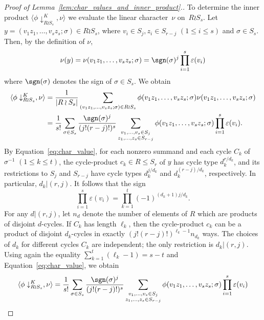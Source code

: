 \begin{proof}[Proof of  Lemma~\ref{lem:char_values_and_inner_product}.]
    To determine the inner product $\langle \phi\downarrow_{R\wr S_{s}}^K,\nu\rangle$ we evaluate the linear character~$\nu$ on~$R\wr S_{s}$.
    Let $y = (v_1z_1,\ldots, v_sz_s; \sigma)\in R\wr S_s$, 
    where $v_i\in S_j, z_i\in S_{r-j}$ $(1 \le i \le s)$ and $\sigma\in S_s$. Then, by the definition of $\nu$,
    \[
        \nu(y)
        = \nu(v_1z_1,\ldots, v_sz_s; \sigma)
        = \sgn(\sigma)^j 
        \prod_{i=1}^s \varepsilon(v_i)
    \]
    where $\sgn(\sigma)$ denotes the sign of $\sigma \in S_s$.
    We obtain
    \begin{align*}
        \langle \phi\downarrow_{R\wr S_{s}}^K,\nu\rangle
        &= \frac{1}{|R\wr S_{s}|}
        \sum_{(v_1 z_1,\ldots,v_s z_s;\sigma) \in R\wr S_{s}} 
        \phi(v_1 z_1,\ldots,v_s z_s;\sigma)
        \nu(v_1 z_1,\ldots,v_s z_s;\sigma) \\
        &= \frac{1}{s!} \sum_{\sigma\in S_s} 
        \frac{\sgn(\sigma)^j}{(j!(r-j)!)^s} 
        \sum_{\substack{v_1,\ldots ,v_s \in S_j \\ z_1,\ldots, z_s \in S_{r-j}}}
        \phi(v_1z_1,\ldots,v_sz_s;\sigma)
        \prod_{i=1}^s \varepsilon(v_i).
    \end{align*}
    By Equation~\eqref{eq:char_value},
    for each nonzero summand and each cycle $C_k$ of $\sigma^{-1}$ $(1 \le k \le t)$,
    the cycle-product $c_k \in R \le S_r$ of $y$ has cycle type $d_k^{r/d_k}$, and its restrictions to $S_j$ and $S_{r-j}$ have cycle types $d_k^{j/{d_k}}$ and $d_k^{(r-j)/{d_k}}$, respectively. 
    In particular, $d_k | (r,j)$.
    It follows that the sign
    \[
        \prod_{i=1}^s \varepsilon(v_i)
        = \prod_{k=1}^{t} (-1)^{(d_k+1)j/d_k}. 
    \]
    For any $d | (r,j)$, 
    let $n_d$ denote the number of elements of $R$ which are products of disjoint $d$-cycles. 
    If $C_k$ has length $\ell_k$, then 
    the cycle-product $c_k$ can be a product of disjoint $d_k$-cycles in exactly $(j!(r-j)!)^{\ell_k-1}n_{d_k}$ ways.
    The choices of $d_k$ for different cycles $C_k$  are independent; the only restriction is $d_k|(r,j)$. 
    Using again the equality $\sum_{k=1}^{t} (\ell_k - 1) = s-t$ and Equation~\eqref{eq:char_value}, 
    we obtain 
    \begin{align*}
        \langle \phi\downarrow_{R\wr S_{s}}^K,\nu \rangle
        &= \frac{1}{s!} \sum_{\sigma\in S_s} 
        \frac{\sgn(\sigma)^j}{(j!(r-j)!)^s} 
        \sum_{\substack{v_1,\ldots ,v_s \in S_j \\ z_1,\ldots, z_s \in S_{r-j}}} 
        \phi(v_1z_1,\ldots,v_sz_s;\sigma) 
        \prod_{i=1}^s \varepsilon(v_i) \\

\end{align*}
\end{proof}
